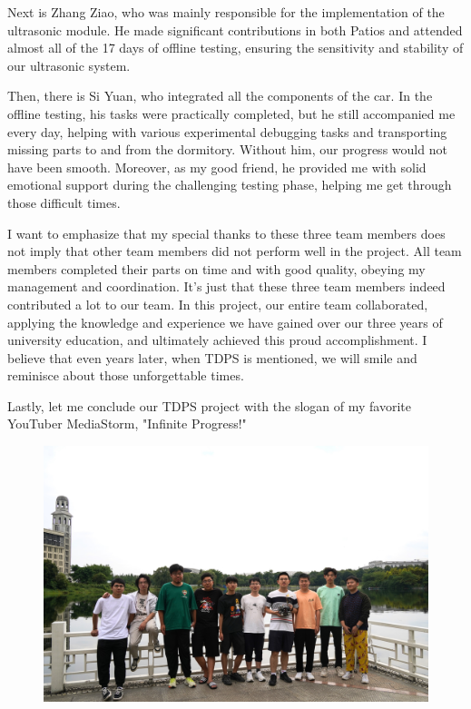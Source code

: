 \documentclass[12pt, a4paper, oneside]{report}
\begin{document}
Next is Zhang Ziao, who was mainly responsible for the implementation of the ultrasonic module. He made significant contributions in both Patios and attended almost all of the 17 days of offline testing, ensuring the sensitivity and stability of our ultrasonic system.

Then, there is Si Yuan, who integrated all the components of the car. In the offline testing, his tasks were practically completed, but he still accompanied me every day, helping with various experimental debugging tasks and transporting missing parts to and from the dormitory. Without him, our progress would not have been smooth. Moreover, as my good friend, he provided me with solid emotional support during the challenging testing phase, helping me get through those difficult times.

I want to emphasize that my special thanks to these three team members does not imply that other team members did not perform well in the project. All team members completed their parts on time and with good quality, obeying my management and coordination. It's just that these three team members indeed contributed a lot to our team. In this project, our entire team collaborated, applying the knowledge and experience we have gained over our three years of university education, and ultimately achieved this proud accomplishment. I believe that even years later, when TDPS is mentioned, we will smile and reminisce about those unforgettable times.

Lastly, let me conclude our TDPS project with the slogan of my favorite YouTuber MediaStorm, "Infinite Progress!"
\begin{figure}[H]
  \centering
  \includegraphics[width=1\textwidth]{pic/Thanks/team02.jpg}
  \label{fig:team02}
\end{figure}
\end{document}
